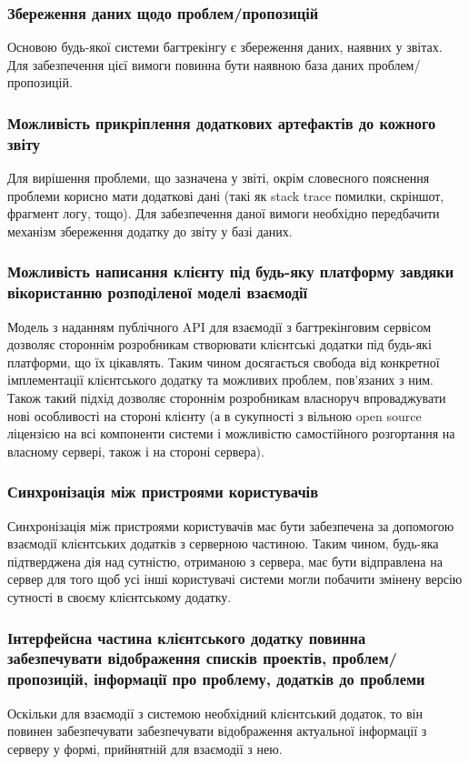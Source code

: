 \documentclass[../main.tex]{subfiles}
\begin{document}
\subsubsection{Збереження даних щодо проблем/пропозицій}
Основою будь-якої системи багтрекінгу є збереження даних, наявних у звітах. Для забезпечення цієї вимоги повинна бути наявною база даних проблем/пропозицій.

\subsubsection{Можливість прикріплення додаткових артефактів до кожного звіту}
Для вирішення проблеми, що зазначена у звіті, окрім словесного пояснення проблеми корисно мати додаткові дані (такі як stack trace помилки, скріншот, фрагмент логу, тощо). Для забезпечення даної вимоги необхідно передбачити механізм збереження додатку до звіту у базі даних.

\subsubsection{Можливість написання клієнту під будь-яку платформу завдяки вікористанню розподіленої моделі взаємодії}
Модель з наданням публічного API для взаємодії з багтрекінговим сервісом дозволяє стороннім розробникам створювати клієнтські додатки під будь-які платформи, що їх цікавлять. Таким чином досягається свобода від конкретної імплементації клієнтського додатку та можливих проблем, пов'язаних з ним. Також такий підхід дозволяє стороннім розробникам власноруч впроваджувати нові особливості на стороні клієнту (а в сукупності з вільною open source ліцензією на всі компоненти системи і можливістю самостійного розгортання на власному сервері, також і на стороні сервера).

\subsubsection{Синхронізація між пристроями користувачів}
Синхронізація між пристроями користувачів має бути забезпечена за допомогою взаємодії клієнтських додатків з серверною частиною. Таким чином, будь-яка підтверджена дія над сутністю, отриманою з сервера, має бути відправлена на сервер для того щоб усі інші користувачі системи могли побачити змінену версію сутності в своєму клієнтському додатку.

\subsubsection{Інтерфейсна частина клієнтського додатку повинна забезпечувати відображення списків проектів, проблем/пропозицій, інформації про проблему, додатків до проблеми}
Оскільки для взаємодії з системою необхідний клієнтський додаток, то він повинен забезпечувати забезпечувати відображення актуальної інформації з серверу у формі, прийнятній для взаємодії з нею.
\end{document}
